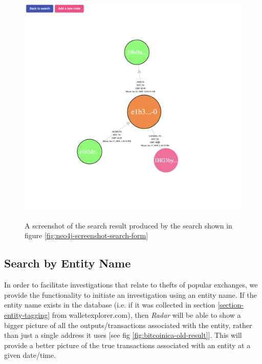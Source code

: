 \begin{figure}[h!]
  \centering
  \includegraphics[width = 15cm]{./figures/ui-screenshots/graph-basic}\\[0.5cm] 
  \caption{A screenshot of the search result produced by the search shown in figure \ref{fig:neo4j-screenshot-search-form}}
  \label{fig:neo4j-screenshot-basic-address-nodes}
\end{figure}

\subsection{Search by Entity Name}
In order to facilitate investigations that relate to thefts of popular exchanges, we provide the functionality to initiate an investigation using an entity name. If the entity name exists in the database (i.e. if it was collected in section \ref{section-entity-tagging} from walletexplorer.com), then \textit{Radar} will be able to show a bigger picture of all the outputs/transactions associated with the entity, rather than just a single address it uses [see fig \ref{fig:bitcoinica-old-result}]. This will provide a better picture of the true transactions associated with an entity at a given date/time. 

